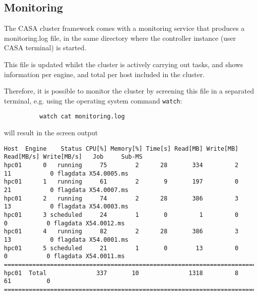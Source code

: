 \subsection{Monitoring}

The CASA cluster framework comes with a monitoring service that produces a monitoring.log file, in the same directory where 
the controller instance (user CASA terminal) is started.

This file is updated whilst the cluster is actively carrying out tasks, and shows information per engine, and total per 
host included in the cluster.

Therefore, it is possible to monitor the cluster by screening this file in a separated terminal, e.g. using the 
operating system command {\tt watch}:

\begin{verbatim} 
          watch cat monitoring.log
\end{verbatim}
will result in the screen output
{\scriptsize
\begin{verbatim}
Host  Engine    Status CPU[%] Memory[%] Time[s] Read[MB] Write[MB] Read[MB/s] Write[MB/s]   Job     Sub-MS
hpc01      0   running     75        2      28       334         2         11           0 flagdata X54.0005.ms
hpc01      1   running     61        2       9       197         0         21           0 flagdata X54.0007.ms
hpc01      2   running     74        2      28       386         3         13           0 flagdata X54.0003.ms
hpc01      3 scheduled     24        1       0         1         0          0           0 flagdata X54.0012.ms
hpc01      4   running     82        2      28       386         3         13           0 flagdata X54.0001.ms
hpc01      5 scheduled     21        1       0        13         0          0           0 flagdata X54.0011.ms
==============================================================================================================
hpc01  Total              337       10              1318         8          61          0
==============================================================================================================

\end{verbatim}
}

